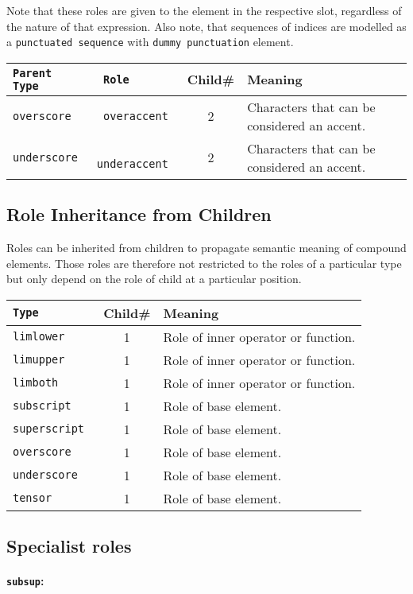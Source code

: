 \documentclass{article}
\begin{document}
Note that these roles are given to the element in the respective
slot, regardless of the nature of that expression.  Also note, that sequences of
indices are modelled as a \texttt{punctuated sequence} with \texttt{dummy
  punctuation} element.


\noindent\begin{tabular}{>{\tt}l>{\tt}lcp{9.5cm}}
  Parent Type & Role & Child\# & Meaning\\\hline
  overscore   & overaccent & 2 & Characters that can be considered an accent.\\
  underscore  & underaccent & 2 & Characters that can be considered an accent. \\
\end{tabular}

\subsection{Role Inheritance from Children}

Roles can be inherited from children to propagate semantic meaning of compound
elements. Those roles are therefore not restricted to the roles of a particular
type but only depend on the role of child at a particular position.

\begin{tabular}{>{\tt}lcp{9.5cm}}
  Type & Child\# & Meaning\\\hline
  limlower & 1 & Role of inner operator or function.\\
  limupper & 1 & Role of inner operator or function.\\
  limboth & 1 & Role of inner operator or function.\\
  subscript & 1 & Role of base element.\\
  superscript & 1 & Role of base element.\\
  overscore & 1 & Role of base element.\\
  underscore & 1 & Role of base element.\\
  tensor & 1 & Role of base element.\\
\end{tabular}
         
\subsection{Specialist roles}

\paragraph{\texttt{subsup}:}
\end{document}
